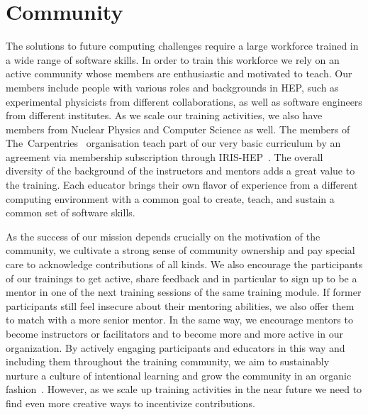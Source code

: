 \documentclass[twocolumn]{svjour3}          %
\begin{document}
\section{Community}\label{sec:Community}
%
The solutions to future computing challenges require a large workforce trained in a wide range of software skills. In order to train this workforce we rely on an active community whose members are enthusiastic and motivated to teach. Our members include people with various roles and backgrounds in HEP, such as experimental physicists from different collaborations, as well as software engineers from different institutes. As we scale our training activities, we also have members from Nuclear Physics and Computer Science as well. The members of The~Carpentries~\cite{carpentries} organisation teach part of our very basic curriculum by an agreement via membership subscription through IRIS-HEP~\cite{iris-hep}. The overall diversity of the background of the instructors and mentors adds a great value to the training. Each educator brings their own flavor of experience from a different computing environment with a common goal to create, teach, and sustain a common set of software skills. 

As the success of our mission depends crucially on the motivation of the community, we cultivate a strong sense of community ownership and pay special care to acknowledge contributions of all kinds. We also encourage the participants of our trainings to get active, share feedback and in particular to sign up to be a mentor in one of the next training sessions of the same training module. If former participants still feel insecure about their mentoring abilities, we also offer them to match with a more senior mentor. In the same way, we encourage mentors to become instructors or facilitators and to become more and more active in our organization. By actively engaging participants and educators in this way and including them throughout the training community, we aim to sustainably nurture a culture of intentional learning and grow the community in an organic fashion~\cite{hsf-community-building}. 
However, as we scale up training activities in the near future we need to find even more creative ways to incentivize contributions. 
\end{document}
